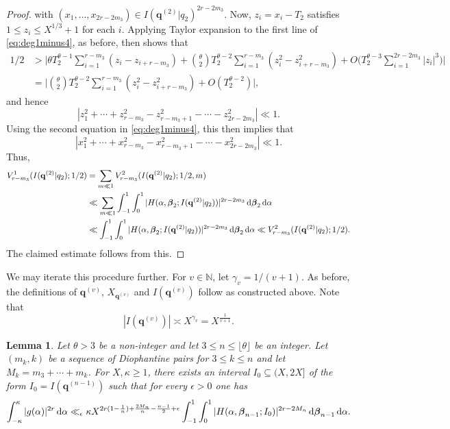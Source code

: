 \documentclass[11pt,reqno]{amsart}
\newtheorem{lemma}{Lemma}[section]
\numberwithin{equation}{section}
\renewcommand{\d}{\,{\rm d}}
\begin{document}
\begin{proof}
with $(x_1,\ldots,x_{2r-2m_3}) \in I(\mathbf{q}^{(2)}|q_2)^{2r-2m_3}$. Now, $z_i = x_i -T_2$ satisfies $1 \leq z_i \leq X^{1/3}+1$ for each $i$. Applying Taylor expansion to the first line of \eqref{eq:deg1minus4}, as before, then shows that 
\begin{align*} 
1/2 &  > \Big| \theta T_2^{\theta-1}\sum_{i=1}^{r-m_3} (z_i-z_{i+r-m_3})+\binom{\theta}{2} T_2^{\theta-2} \sum_{i=1}^{r-m_3} (z_i^2-z_{i+r-m_3}^2) +O\Big(T_2^{\theta-3} \sum_{i=1}^{2r-2m_3} |z_i|^3\Big) \Big| 
\\ 
& = \Big| \binom{\theta}{2} T_2^{\theta-2} \sum_{i=1}^{r-m_3} (z_i^2-z_{i+r-m_3}^2) +O(T_2^{\theta-2}) \Big|,  
\end{align*}
and hence 
\[ |z_1^2+\cdots+z_{r-m_3}^2-z_{r-m_3+1}^2 -\cdots-z_{2r-2m_3}^2| \ll 1.\]
Using the second equation in \eqref{eq:deg1minus4}, this then implies that 
\[|x_1^2+\cdots+x_{r-m_3}^2-x_{r-m_3+1}^2 -\cdots-x_{2r-2m_3}^2| \ll 1.\] Thus, 
\begin{align*}
V_{r-m_3}^1(I(\mathbf{q}^{(2)}|q_2);1/2) & = \sum_{m \ll 1} V_{r-m_3}^2(I(\mathbf{q}^{(2)}|q_2); 1/2,m)
\\ 
& \ll \sum_{m \ll 1} \int_{-1}^{1} \int_0^1 |H(\alpha,\boldsymbol{\beta}_2; I(\mathbf{q}^{(2)}|q_2) )|^{2r-2m_3} \d \boldsymbol{\beta}_2 \d \alpha 
\\ 
& \ll \int_{-1}^{1} \int_0^1 | H(\alpha,\boldsymbol{\beta}_2;I(\mathbf{q}^{(2)}|q_2) )|^{2r-2m_3} \d \boldsymbol{\beta}_2 \d \alpha \ll V_{r-m_3}^2( I(\mathbf{q}^{(2)}|q_2);1/2). 
\end{align*}
The claimed estimate follows from this. 
\end{proof}











We may iterate this procedure further. For $v \in \mathbb{N}$, let $\gamma_v = 1/(v+1)$. As before, the definitions of $\mathbf{q}^{(v)}$, $X_{\mathbf{q}^{(v)}}$ and $I(\mathbf{q}^{(v)})$ follow as constructed above. Note that 
\[ |I(\mathbf{q}^{(v)})| \asymp X^{\gamma_v} = X^{\frac{1}{v+1}}.\] 

\begin{lemma} \label{lem:meancasegen}
Let $\theta > 3$ be a non-integer and let $3 \leq n \leq \lfloor \theta \rfloor$ be an integer. Let $(m_k,k)$ be a sequence of Diophantine pairs for $3 \leq k \leq n$ and let $M_k = m_3+\cdots+m_k$. For $X, \kappa \geq 1$, there exists an interval $I_0 \subseteq (X,2X]$ of the form $I_0 = I(\mathbf{q}^{(n-1)})$ such that for every $\epsilon > 0$ one has 
\[ \int_{-\kappa}^{\kappa} |g(\alpha)|^{2r} \d\alpha \ll_{\epsilon} \kappa X^{2r(1-\frac{1}{n})+\frac{2M_n}{n}-\frac{n-1}{2}+\epsilon} \int_{-1}^{1} \int_{0}^{1} |H(\alpha,\boldsymbol{\beta}_{n-1};I_0 )|^{2r-2M_n} \d \boldsymbol{\beta}_{n-1} \d \alpha. \]
\end{lemma}
\end{document}
